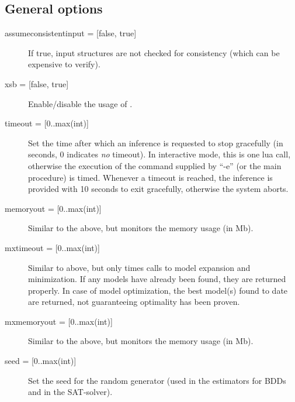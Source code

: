 \subsection{General options}

\begin{description}
	\item[{assumeconsistentinput = [false, true]}] If true, input structures are not checked for consistency (which can be expensive to verify). 
	\item[{xsb = [false, true]}] Enable/disable the usage of \xsb.
	\item[{timeout = [0..max(int)]}] Set the time after which an inference is requested to stop gracefully (in seconds, 0 indicates \emph{no} timeout).
		In interactive mode, this is one lua call, otherwise the execution of the command supplied by ``-e'' (or the main procedure) is timed.
		Whenever a timeout is reached, the inference is provided with 10 seconds to exit gracefully, otherwise the system aborts.
	\item[{memoryout = [0..max(int)]}] Similar to the above, but monitors the memory usage (in Mb).				
	\item[{mxtimeout = [0..max(int)]}] Similar to above, but only times calls to model expansion and minimization.
		If any models have already been found, they are returned properly.
		In case of model optimization, the best model(s) found to date are returned, not guaranteeing optimality has been proven.
	\item[{mxmemoryout = [0..max(int)]}] Similar to the above, but monitors the memory usage (in Mb). 
	\item[{seed = [0..max(int)]}] Set the seed for the random generator (used in the estimators for BDDs and in the SAT-solver).

\end{description}
